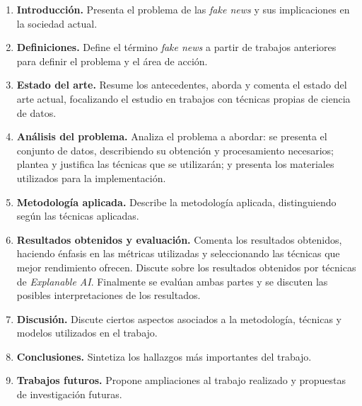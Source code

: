 \begin{enumerate}
    \item \textbf{Introducción.} Presenta el problema de las \textit{fake news} y sus implicaciones en la sociedad actual.
    \item \textbf{Definiciones.} Define el término \textit{fake news} a partir de trabajos anteriores para definir el problema y el área de acción.
    \item \textbf{Estado del arte.} Resume los antecedentes, aborda y comenta el estado del arte actual, focalizando el estudio en trabajos con técnicas propias de ciencia de datos.
    \item \textbf{Análisis del problema.} Analiza el problema a abordar: se presenta el conjunto de datos, describiendo su obtención y procesamiento necesarios; plantea y justifica las técnicas que se utilizarán; y presenta los materiales utilizados para la implementación.
    \item \textbf{Metodología aplicada.} Describe la metodología aplicada, distinguiendo según las técnicas aplicadas.
    \item \textbf{Resultados obtenidos y evaluación.} Comenta los resultados obtenidos, haciendo énfasis en las métricas utilizadas y seleccionando las técnicas que mejor rendimiento ofrecen. Discute sobre los resultados obtenidos por técnicas de \textit{Explanable AI}. Finalmente se evalúan ambas partes y se discuten las posibles interpretaciones de los resultados.
    \item \textbf{Discusión.} Discute ciertos aspectos asociados a la metodología, técnicas y modelos utilizados en el trabajo.
    \item \textbf{Conclusiones.} Sintetiza los hallazgos más importantes del trabajo.
    \item \textbf{Trabajos futuros.} Propone ampliaciones al trabajo realizado y propuestas de investigación futuras.
\end{enumerate}


